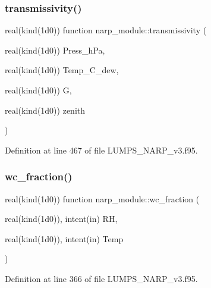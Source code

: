 \mbox{\label{namespacenarp__module_aeae3a1e345682a38338ecdf71bcf1c8e}} 
\subsubsection{\texorpdfstring{transmissivity()}{transmissivity()}}
{\footnotesize\ttfamily real(kind(1d0)) function narp\+\_\+module\+::transmissivity (\begin{DoxyParamCaption}\item[{real(kind(1d0))}]{Press\+\_\+h\+Pa,  }\item[{real(kind(1d0))}]{Temp\+\_\+\+C\+\_\+dew,  }\item[{real(kind(1d0))}]{G,  }\item[{real(kind(1d0))}]{zenith }\end{DoxyParamCaption})}



Definition at line 467 of file L\+U\+M\+P\+S\+\_\+\+N\+A\+R\+P\+\_\+v3.\+f95.

\mbox{\label{namespacenarp__module_a1774d32db350c89aad964f2f45ceb46e}} 
\subsubsection{\texorpdfstring{wc\+\_\+fraction()}{wc\_fraction()}}
{\footnotesize\ttfamily real(kind(1d0)) function narp\+\_\+module\+::wc\+\_\+fraction (\begin{DoxyParamCaption}\item[{real(kind(1d0)), intent(in)}]{RH,  }\item[{real(kind(1d0)), intent(in)}]{Temp }\end{DoxyParamCaption})}



Definition at line 366 of file L\+U\+M\+P\+S\+\_\+\+N\+A\+R\+P\+\_\+v3.\+f95.

